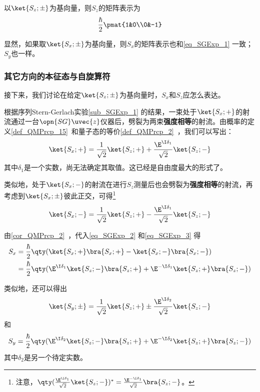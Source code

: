 以$\ket{S_z; \pm}$为基向量，则$S_z$的矩阵表示为
\begin{equation}\label{eq_SGExp_1}
\frac{\hbar}{2}\pmat{1&0\\0&-1}
\end{equation}


显然，如果取$\ket{S_x; \pm}$为基向量，则$S_x$的矩阵表示也和\autoref{eq_SGExp_1} 一致；$S_y$也一样。



\subsubsection{其它方向的本征态与自旋算符}


接下来，我们讨论在给定$\ket{S_z; \pm}$为基向量时，$S_x$和$S_z$应怎么表达。

根据序列Stern-Gerlach实验\autoref{sub_SGExp_1} 的结果，一束处于$\ket{S_x; +}$的射流通过一台$\opn{SG}\uvec{z}$仪器后，劈裂为两束\textbf{强度相等}的射流。由概率的定义\autoref{def_QMPrcp_15}~和量子态的等价\autoref{def_QMPrcp_2}~，我们可以写出：
\begin{equation}\label{eq_SGExp_2}
\ket{S_x; +}=\frac{1}{\sqrt{2}}\ket{S_z; +}+\frac{\E^{\I \delta_1}}{\sqrt{2}}\ket{S_z; -}
\end{equation}
其中$\delta_1$是一个实数，尚无法确定其取值。这已经是自由度最大的形式了。

类似地，处于$\ket{S_x; -}$的射流在进行$S_z$测量后也会劈裂为\textbf{强度相等}的射流，再考虑到$\ket{S_x; \pm}$彼此正交，可得\footnote{注意，$\qty(\frac{\E^{\I \delta_1}}{\sqrt{2}}\ket{S_z; -})^*=\frac{\E^{-\I \delta_1}}{\sqrt{2}}\bra{S_z; -}$。}
\begin{equation}\label{eq_SGExp_3}
\ket{S_x; -}=\frac{1}{\sqrt{2}}\ket{S_z; +}-\frac{\E^{\I \delta_1}}{\sqrt{2}}\ket{S_z; -}
\end{equation}


由\autoref{cor_QMPrcp_2}~，代入\autoref{eq_SGExp_2} 和\autoref{eq_SGExp_3} 得
\begin{equation}\label{eq_SGExp_4}
\begin{aligned}
S_x &= \frac{\hbar}{2}\qty(\ket{S_x; +}\bra{S_x; +}-\ket{S_x; -}\bra{S_x; -})\\
&=\frac{\hbar}{2}\qty(\E^{\I\delta_1}\ket{S_z; -}\bra{S_z; +} + \E^{-\I\delta_1}\ket{S_z; +}\bra{S_z; -})
\end{aligned}
\end{equation}

类似地，还可以得出
\begin{equation}\label{eq_SGExp_7}
\ket{S_y; \pm} = \frac{1}{\sqrt{2}}\ket{S_z; +}\pm\frac{\E^{\I\delta_2}}{\sqrt{2}}\ket{S_z; -}
\end{equation}
和
\begin{equation}\label{eq_SGExp_5}
S_y=\frac{\hbar}{2}\qty(\E^{\I\delta_2}\ket{S_z; -}\bra{S_z; +} + \E^{-\I\delta_2}\ket{S_z; +}\bra{S_z; -})
\end{equation}
其中$\delta_2$是另一个待定实数。


